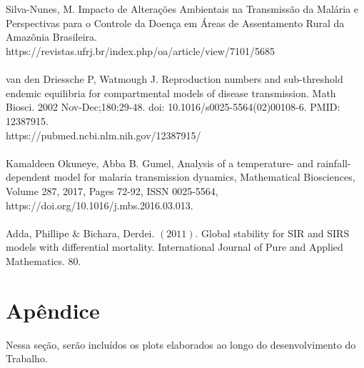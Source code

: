 \documentclass[12pt]{article}
\begin{document}
\\\\
\noindent [17] Silva-Nunes, M. Impacto de Alterações Ambientais na Transmissão da Malária e Perspectivas para o Controle da Doença em Áreas de Assentamento Rural da Amazônia Brasileira. \\ https://revistas.ufrj.br/index.php/oa/article/view/7101/5685
\\\\
\noindent [18] van den Driessche P, Watmough J. Reproduction numbers and sub-threshold endemic equilibria for compartmental models of disease transmission. Math Biosci. 2002 Nov-Dec;180:29-48. doi: 10.1016/s0025-5564(02)00108-6. PMID: 12387915. \\ 
https://pubmed.ncbi.nlm.nih.gov/12387915/
\\\\
\noindent [19] Kamaldeen Okuneye, Abba B. Gumel, Analysis of a temperature- and rainfall-dependent model for malaria transmission dynamics,
Mathematical Biosciences, Volume 287, 2017, Pages 72-92, ISSN 0025-5564,
https://doi.org/10.1016/j.mbs.2016.03.013.
\\\\
\noindent [20] Adda, Phillipe $\&$ Bichara, Derdei. $(2011)$. 
Global stability for SIR and SIRS models with differential mortality. 
International Journal of Pure and Applied Mathematics. 80. 


\newpage
\section{Apêndice}
Nessa seção, serão incluídos os plots elaborados ao longo do desenvolvimento do Trabalho.
\end{document}
